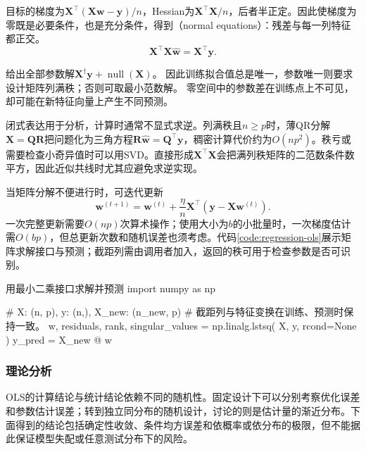 目标的梯度为$\bm{X}^{\top}(\bm{X}\bm{w}-\bm{y})/n$，Hessian为$\bm{X}^{\top}\bm{X}/n$，后者半正定。因此使梯度为零既是必要条件，也是充分条件，得到（normal equations）：残差与每一列特征都正交。
\begin{equation}
  \bm{X}^{\top}\bm{X}\widehat{\bm{w}}=\bm{X}^{\top}\bm{y}.
  \label{eq:regression-normal-equations}
\end{equation}

给出全部参数解$\bm X^\dagger\bm y+\operatorname{null}(\bm X)$。
因此训练拟合值总是唯一，参数唯一则要求设计矩阵列满秩；否则可取最小范数解。
零空间中的参数差在训练点上不可见，却可能在新特征向量上产生不同预测。

闭式表达用于分析，计算时通常不显式求逆。列满秩且$n\geq p$时，薄QR分解$\bm{X}=\bm{Q}\bm{R}$把问题化为三角方程$\bm{R}\widehat{\bm{w}}=\bm{Q}^{\top}\bm{y}$，稠密计算代价约为$O(np^2)$。秩亏或需要检查小奇异值时可以用SVD。直接形成$\bm{X}^{\top}\bm{X}$会把满列秩矩阵的二范数条件数平方，因此近似共线时尤其应避免求逆实现。

当矩阵分解不便进行时，可迭代更新
\begin{equation}
  \bm{w}^{(t+1)}
  =\bm{w}^{(t)}+\frac{\eta}{n}
       \bm{X}^{\top}(\bm{y}-\bm{X}\bm{w}^{(t)}).
  \label{eq:regression-ols-gradient}
\end{equation}
一次完整更新需要$O(np)$次算术操作；使用大小为$b$的小批量时，一次梯度估计需$O(bp)$，但总更新次数和随机误差也须考虑。代码\ref{code:regression-ols}展示矩阵求解接口与预测；截距列需由调用者加入，返回的秩可用于检查参数是否可识别。

\begin{codeblock}[language=Python,label={code:regression-ols},unbreakable]{用最小二乘接口求解并预测}
import numpy as np

# X: (n, p), y: (n,), X_new: (n_new, p)
# 截距列与特征变换在训练、预测时保持一致。
w, residuals, rank, singular_values = np.linalg.lstsq(
    X, y, rcond=None
)
y_pred = X_new @ w
\end{codeblock}

\subsubsection{理论分析}
\label{sec:regression-ols-theory}

OLS的计算结论与统计结论依赖不同的随机性。固定设计下可以分别考察优化误差和参数估计误差；转到独立同分布的随机设计，讨论的则是估计量的渐近分布。下面得到的结论包括确定性收敛、条件均方误差和依概率或依分布的极限，但不能据此保证模型失配或任意测试分布下的风险。

